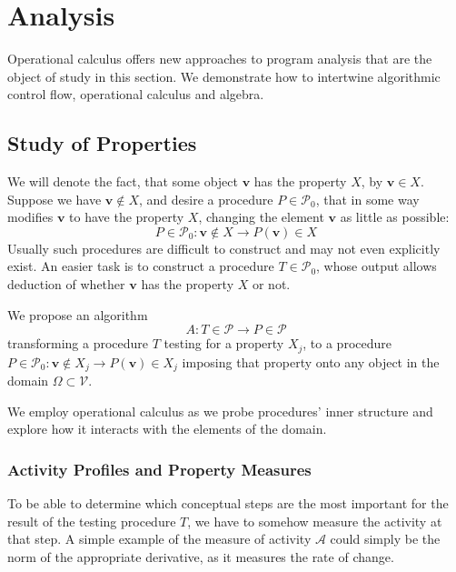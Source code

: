 \documentclass[11pt]{article}
\newcommand{\VV}{\mathcal{V}}
\newcommand{\vv}{\mathbf{v}}
\newcommand{\dP}{\mathcal{P}}
\begin{document}
\section{Analysis}\label{sec:Analysis}
  
   Operational calculus offers new approaches to program analysis that are the
   object of study in this section.
   We demonstrate how to intertwine algorithmic control flow, operational calculus and algebra.  
  
  \subsection{Study of Properties}\label{sec:studyProperties}
  
  We will denote the fact, that some object $\vv$ has the property $X$, by $\vv\in
  X$. Suppose we have $\vv\notin X$, and desire a procedure $P\in\dP_0$, that in
  some way modifies $\vv$ to have the property $X$, changing the element $\vv$ as
  little as possible: 
  \begin{equation}\label{eq:procP}
  P\in \dP_0:\vv\notin X\to P(\vv)\in X
  \end{equation}
  Usually such procedures are difficult to construct and may not even explicitly
  exist. An easier task is to construct a procedure $T\in\dP_0$, whose output
  allows deduction of whether $\vv$ has the property $X$ or not. 
  
   We propose an algorithm
   \begin{equation}\label{eq:algA}
     A:T\in\dP\to P\in\dP
     \end{equation}
     transforming a procedure $T$ testing for a property $X_j$, to a procedure
     $P\in \dP_0:\vv\notin X_j\to P(\vv)\in X_j$ imposing that
     property onto any object in the domain $\Omega\subset \VV$.
   
   We employ operational calculus as we probe
   procedures' inner structure and explore how it interacts with the elements of
   the domain.
 
\subsubsection{Activity Profiles and Property Measures}\label{sec:propertyMeasure}
    
To be able to determine which conceptual steps are the most important for the
result of the testing procedure $T$, we have to somehow measure the activity
at that step. A simple example of the measure of activity $\mathcal{A}$ could simply be the norm of the
appropriate derivative, as it measures the rate of change. 
\end{document}
